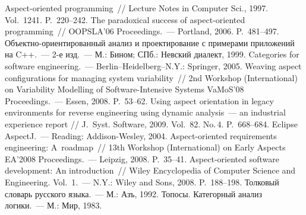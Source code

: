 \begin{multicols}{2}
{{\begin{thebibliography}{99}
 Aspect-oriented programming~// Lecture Notes in Computer Sci., 
1997. Vol.~1241. P.~220--242.
 The paradoxical success of aspect-oriented programming~// OOPSLA'06 
Proceedings.~--- Portland, 2006. P.~481--497.
 Объектно-ори\-ен\-ти\-ро\-ван\-ный анализ и проектирование с примерами 
приложений на C++.~--- 2-е изд.~--- М.: Бином; СПб.: Невский диалект, 1999.
 Categories for software engineering.~--- Berlin--Heidelberg--N.Y.: Springer, 
2005.
 Weaving aspect 
configurations for managing system variability~// 2nd Workshop (International) on Variability 
Modelling of Software-Intensive Systems VaMoS'08 Proceedings.~--- Essen, 2008. P.~53--62.
 Using aspect 
orientation in legacy environments for reverse engineering using dynamic analysis~--- an industrial 
experience report // J.~Syst. Software, 2009. Vol.~82. No.\,4. P.~668--684.
 Eclipse AspectJ.~--- Reading: 
Addison-Wesley, 2004.
 Aspect-oriented requirements engineering: A~roadmap~// 13th 
Workshop (International) on Early Aspects EA'2008 Proceedings.~--- Leipzig, 2008. P.~35--41.
 Aspect-oriented software development: An 
introduction~// Wiley Encyclopedia of Computer Science and Engineering. Vol.~1.~--- N.Y.: Wiley 
and Sons, 2008. P.~188--198.
 Толковый словарь русского языка.~--- М.: Азъ, 1992.
 Топосы. Категорный анализ логики.~--- М.: Мир, 1983.


\end{thebibliography}}}
\end{multicols}
